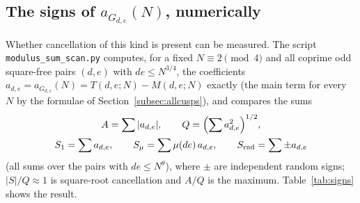 ﻿\documentclass[11pt]{amsart}
\theoremstyle{remark}
\begin{document}
\subsection{The signs of $a_{G_{d,e}}(N)$, numerically}
Whether cancellation of this kind is present can be measured. The script \texttt{modulus\_sum\_scan.py} computes, for a fixed $N\equiv2\pmod4$ and all coprime odd square-free pairs $(d,e)$ with $de\le N^{3/4}$, the coefficients $a_{d,e}=a_{G_{d,e}}(N)=T(d,e;N)-M(d,e;N)$ exactly (the main term for every $N$ by the formulae of Section~\ref{subsec:allcusps}), and compares the sums
\begin{gather*}
A=\sum|a_{d,e}|,\qquad Q=\Bigl(\sum a_{d,e}^2\Bigr)^{1/2},\\
S_1=\sum a_{d,e},\qquad S_\mu=\sum\mu(de)\,a_{d,e},\qquad S_{\mathrm{rnd}}=\sum\pm a_{d,e}
\end{gather*}
(all sums over the pairs with $de\le N^\theta$),
where $\pm$ are independent random signs; $|S|/Q\approx1$ is square-root cancellation and $A/Q$ is the maximum. Table~\ref{tab:signs} shows the result.
\end{document}
